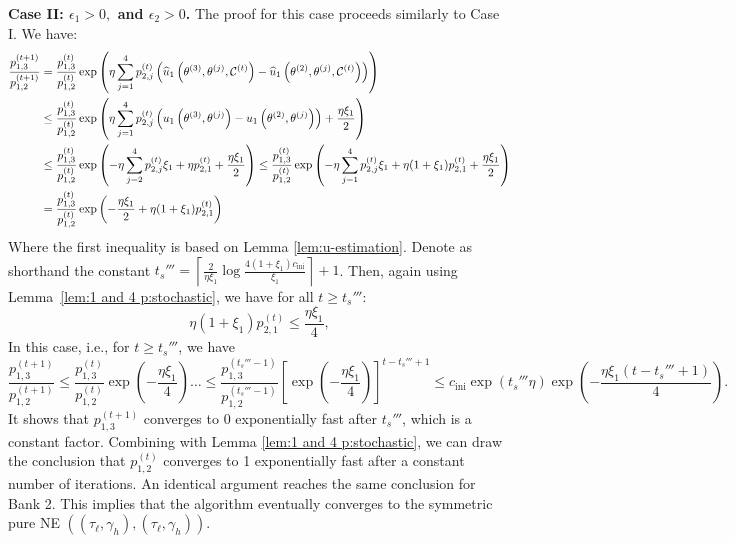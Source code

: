 \noindent \textbf{Case II: $\epsilon_1>0,$ and $\epsilon_2>0$.} 
The proof for this case proceeds similarly to Case I.
We have:
\begin{equation}
    \begin{split}
\frac{p^{(t+1)}_{1,3}}{p^{(t+1)}_{1,2}} = {} & \frac{p^{(t)}_{1,3}}{p^{(t)}_{1,2}}\exp\left( \eta \sum_{j=1}^4p^{(t)}_{2,j}\left(\widehat{u}_1\left(\theta^{(3)}, \theta^{(j)},\mathcal{C}^{(t)}\right)-\widehat{u}_1\left(\theta^{(2)}, \theta^{(j)},\mathcal{C}^{(t)}\right)\right) \right) \\
\leq {} & \frac{p^{(t)}_{1,3}}{p^{(t)}_{1,2}}\exp\left( \eta \sum_{j=1}^4p^{(t)}_{2,j}\left(u_1\left(\theta^{(3)}, \theta^{(j)}\right)-u_1\left(\theta^{(2)}, \theta^{(j)}\right)\right) + \frac{\eta\xi_1}{2}\right) \\
\leq {} & \frac{p^{(t)}_{1,3}}{p^{(t)}_{1,2}}\exp\left( -\eta \sum_{j=2}^4p^{(t)}_{2,j}\xi_1   + \eta p^{(t)}_{2,1} + \frac{\eta\xi_1}{2} \right)
\leq  \frac{p^{(t)}_{1,3}}{p^{(t)}_{1,2}}\exp\left( -\eta \sum_{j=1}^4p^{(t)}_{2,j}\xi_1   + \eta(1+\xi_1)  p^{(t)}_{2,1} + \frac{\eta\xi_1}{2}\right)\\
= {} & \frac{p^{(t)}_{1,3}}{p^{(t)}_{1,2}}\exp\left(-\frac{\eta\xi_1}{2} + \eta(1+\xi_1)  p^{(t)}_{2,1}  \right)
    \end{split}
\end{equation}
Where the first inequality is based on Lemma \ref{lem:u-estimation}. Denote as shorthand the constant $t_s'''=\left\lceil\frac{2}{\eta\xi_1}\log\frac{4(1+\xi_1)c_{\text{ini}}}{\xi_1}\right\rceil+1$.
Then, again using Lemma~\ref{lem:1 and 4 p:stochastic}, we have for all $t \geq t_s'''$:
$$ \eta(1+\xi_1)p_{2,1}^{(t)}\leq \frac{\eta\xi_1}{4}, $$
In this case, i.e., for $t\geq t_s'''$, we have 
$$\frac{p^{(t+1)}_{1,3}}{p^{(t+1)}_{1,2}} \leq \frac{p^{(t)}_{1,3}}{p^{(t)}_{1,2}} \exp\left(-\frac{\eta\xi_1}{4}\right) \ldots \leq \frac{p^{(t_s'''-1)}_{1,3}}{p^{(t_s'''-1)}_{1,2}} \left[\exp\left(-\frac{\eta\xi_1}{4}\right)\right]^{t-t_s'''+1}\leq c_{\text{ini}}\exp(t_s'''\eta)\exp\left(-\frac{\eta\xi_1(t-t_s'''+1)}{4}\right). $$
It shows that $p_{1,3}^{(t+1)}$ converges to 0 exponentially fast after $t_s'''$, which is a constant factor. Combining with Lemma \ref{lem:1 and 4 p:stochastic}, we can draw the conclusion that $p_{1,2}^{(t)}$ converges to 1 exponentially fast after a constant number of iterations. 
An identical argument reaches the same conclusion for Bank 2.
This implies that the algorithm eventually converges to the symmetric pure NE $((\tau_{\ell},\gamma_h),(\tau_{\ell},\gamma_h))$.\\

